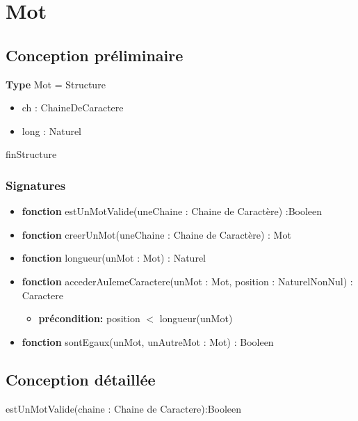 \documentclass{article}
\begin{document}
    \pagestyle{empty}
    \noindent

    \section*{Mot}
    \subsection*{Conception préliminaire}

    \textbf{Type} Mot = Structure
	\begin{itemize}[label=$\ $, leftmargin=2cm]
		 \item ch : ChaineDeCaractere
		 \item long : Naturel
	\end{itemize}
    finStructure
    
    \subsubsection*{Signatures}

	\begin{itemize}[label=$\ $, leftmargin=1cm]
		 \item \textbf{fonction} estUnMotValide(uneChaine : Chaine de Caractère) :Booleen
		 \item \textbf{fonction} creerUnMot(uneChaine : Chaine de Caractère) : Mot
		 \item \textbf{fonction} longueur(unMot : Mot) : Naturel
		 \item \textbf{fonction} accederAuIemeCaractere(unMot : Mot, position : NaturelNonNul) : Caractere
		 \begin{itemize}[label=$| $]
            \item \textbf{précondition:} position $<$ longueur(unMot)
         \end{itemize}
         \item \textbf{fonction} sontEgaux(unMot, unAutreMot : Mot) : Booleen
	\end{itemize} 

    \subsection*{Conception détaillée}

    \begin{function}
        \SetAlgoLined
        \caption{estUnMotValide(chaine : Chaine de Caractere):Booleen}
    \end{function}
        
\end{document}
